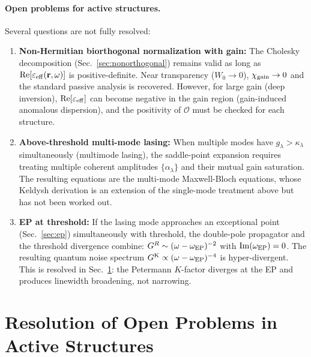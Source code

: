 \documentclass[12pt]{article}
\newcommand{\Keldysh}{{\rm K}}
\begin{document}
\paragraph{Open problems for active structures.}
Several questions are not fully resolved:
\begin{enumerate}
  \item \textbf{Non-Hermitian biorthogonal normalization with gain:}
    The Cholesky decomposition (Sec.~\ref{sec:nonorthogonal}) remains valid
    as long as $\mathrm{Re}[\varepsilon_{\rm eff}(\mathbf{r},\omega)]$ is
    positive-definite.  Near transparency ($W_0\to 0$), $\chi_{\rm gain}\to 0$
    and the standard passive analysis is recovered.  However, for large
    gain (deep inversion), $\mathrm{Re}[\varepsilon_{\rm eff}]$ can become
    negative in the gain region (gain-induced anomalous dispersion), and
    the positivity of $\mathcal{O}$ must be checked for each structure.

  \item \textbf{Above-threshold multi-mode lasing:}
    When multiple modes have $g_\lambda > \kappa_\lambda$
    simultaneously (multimode lasing), the saddle-point expansion requires
    treating multiple coherent amplitudes $\{\alpha_\lambda\}$ and their
    mutual gain saturation.  The resulting equations are the multi-mode
    Maxwell-Bloch equations, whose Keldysh derivation is an extension of
    the single-mode treatment above but has not been worked out.

  \item \textbf{EP at threshold:}
    If the lasing mode approaches an exceptional point (Sec.~\ref{sec:ep})
    simultaneously with threshold, the double-pole propagator and the
    threshold divergence combine: $G^R \sim (\omega-\omega_{\rm EP})^{-2}$
    with $\mathrm{Im}(\omega_{\rm EP}) = 0$.  The resulting quantum
    noise spectrum $G^\Keldysh \propto (\omega-\omega_{\rm EP})^{-4}$
    is hyper-divergent.  This is resolved in Sec.~\ref{sec:gain_openproblems}:
    the Petermann $K$-factor diverges at the EP and produces linewidth
    broadening, not narrowing.
\end{enumerate}

\section{Resolution of Open Problems in Active Structures}
\label{sec:gain_openproblems}
\end{document}
